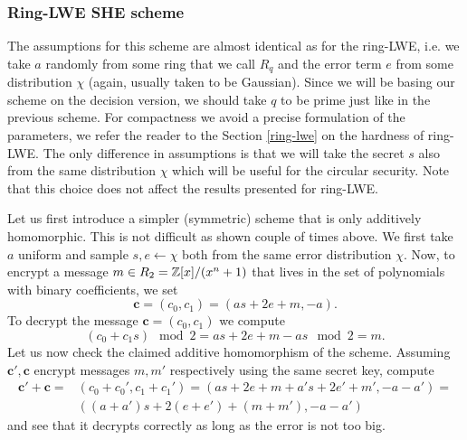 \subsubsection*{Ring-LWE SHE scheme}
The assumptions for this scheme are almost identical as for the ring-LWE, i.e. we take $a$ randomly from some ring that we call $R_q$ and the error term $e$ from some distribution $\chi$ (again, usually taken to be Gaussian). Since we will be basing our scheme on the decision version, we should take $q$ to be prime just like in the previous scheme. For compactness we avoid a precise formulation of the parameters, we refer the reader to the Section \ref{ring-lwe} on the hardness of ring-LWE. The only difference in assumptions is that we will take the secret $s$ also from the same distribution $\chi$ which will be useful for the circular security. Note that this choice does not affect the results presented for ring-LWE. 

Let us first introduce a simpler (symmetric) scheme that is only additively homomorphic. This is not difficult as shown couple of times above. We first take $a$ uniform and sample $s,e \leftarrow \chi$ both from the same error distribution $\chi$. Now, to encrypt a message $m \in R_2 = \mathbb{Z}[x]/(x^n +1)$ that lives in the set of polynomials with binary coefficients, we set 
\[ \bm{c} = (c_0, c_1) = (as +2e +m, -a). \]
To decrypt the message $\bm{c} = (c_0, c_1)$ we compute
\[(c_0 +c_1s) \mod 2 = as+2e+m -as \mod 2 = m. \]
Let us now check the claimed additive homomorphism of the scheme. Assuming $\bm{c'}, \bm{c}$ encrypt messages $m, m'$ respectively using the same secret key, compute
\begin{align*}
	\bm{c'+c} = & (c_0 +c_0', c_1+c_1') = (as +2e +m + a's +2e' +m', -a - a') = \\ & ((a + a')s +2(e+e') +(m+m'), -a - a')
\end{align*}
and see that it decrypts correctly as long as the error is not too big.

